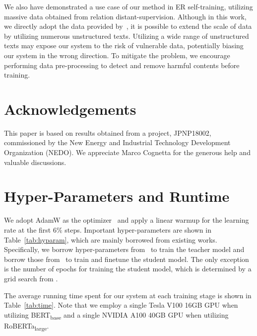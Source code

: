\documentclass[11pt]{article}
\begin{document}
We also have demonstrated a use case of our method in ER self-training, utilizing massive data obtained from relation distant-supervision.
Although in this work, we directly adopt the data provided by~\citet{yao-etal-2019-docred}, it is possible to extend the scale of data by utilizing numerous unstructured texts.
Utilizing a wide range of unstructured texts may expose our system to the risk of vulnerable data, potentially biasing our system in the wrong direction.
To mitigate the problem, we encourage performing data pre-processing to detect and remove harmful contents before training.

\section*{Acknowledgements}

This paper is based on results obtained from a project, JPNP18002, commissioned by the New Energy and Industrial Technology Development Organization (NEDO).
We appreciate Marco Cognetta for the generous help and valuable discussions.




\appendix

\section{Hyper-Parameters and Runtime}
\label{sec:hyparam}

We adopt AdamW as the optimizer~\cite{loshchilov2018decoupled} and apply a linear warmup for the learning rate at the first 6\% steps.
Important hyper-parameters are shown in Table~\ref{tab:hyparam}, which are mainly borrowed from existing works.
Specifically, we borrow hyper-parameters from~\citet{zhou2021atlop} to train the teacher model and borrow those from~\citet{tan-etal-2022-document} to train and finetune the student model. 
The only exception is the number of epochs for training the student model, which is determined by a grid search from .

The average running time spent for our system at each training stage is shown in Table~\ref{tab:time}.
Note that we employ a single Tesla V100 16GB GPU when utilizing BERT\textsubscript{base} and a single NVIDIA A100 40GB GPU when utilizing RoBERTa\textsubscript{large}.
\end{document}
